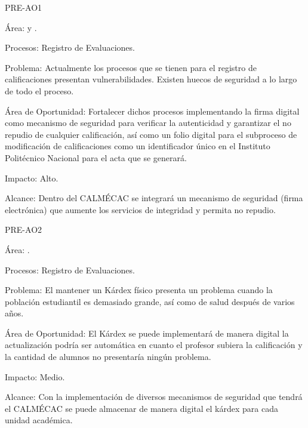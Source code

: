 
\begin{AreaOportunidad}{PRE-AO1}
	\item[Área:]  y .
	\item[Procesos:] Registro de Evaluaciones.
	\item[Problema:] Actualmente los procesos que se tienen para el registro de calificaciones presentan vulnerabilidades. Existen huecos de seguridad a lo largo de todo el proceso.
	\item[Área de Oportunidad:] Fortalecer dichos procesos implementando la firma digital como mecanismo de seguridad para verificar la autenticidad y garantizar el no repudio de cualquier calificación, así como un folio digital para el subproceso de modificación de calificaciones como un identificador único en el Instituto Politécnico Nacional para el acta que se generará.
	\item[Impacto:] Alto.
	\item[Alcance:] Dentro del CALMÉCAC se integrará un mecanismo de seguridad (firma electrónica) que aumente los servicios de integridad y permita no repudio.
\end{AreaOportunidad}


\begin{AreaOportunidad}{PRE-AO2}
	\item[Área:] .
	\item[Procesos:] Registro de Evaluaciones.
	\item[Problema:] El mantener un Kárdex físico presenta un problema cuando la población estudiantil es demasiado grande, así como de salud después de varios años.
	\item[Área de Oportunidad:]El Kárdex se puede implementará de manera digital la actualización podría ser automática en cuanto el profesor subiera la calificación y la cantidad de alumnos no presentaría ningún problema.
	\item[Impacto:] Medio.
	\item[Alcance:] Con la implementación de diversos mecanismos de seguridad que tendrá el CALMÉCAC se puede almacenar de manera digital  el kárdex para cada unidad académica.
\end{AreaOportunidad}


